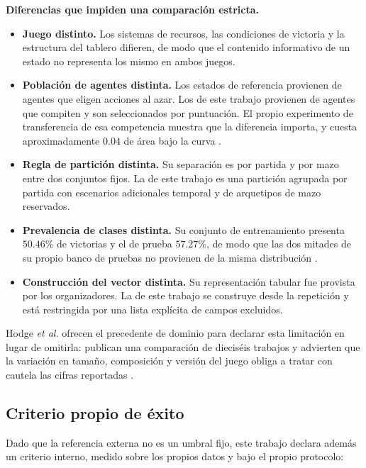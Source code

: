 \noindent\textbf{Diferencias que impiden una comparación estricta.}

\begin{itemize}
  \item \textbf{Juego distinto.} Los sistemas de recursos, las condiciones
        de victoria y la estructura del tablero difieren, de modo que el
        contenido informativo de un estado no representa los mismo en ambos
        juegos.
  \item \textbf{Población de agentes distinta.} Los estados de referencia
        provienen de agentes que eligen acciones al azar. Los de este
        trabajo provienen de agentes que compiten y son seleccionados por puntuación.
        El propio experimento de transferencia de esa competencia muestra
        que la diferencia importa, y cuesta aproximadamente $0.04$ de área
        bajo la curva \cite{janusz_hearthstone_2017}.
  \item \textbf{Regla de partición distinta.} Su separación es por partida y
        por mazo entre dos conjuntos fijos. La de este trabajo es una
        partición agrupada por partida con escenarios adicionales temporal y
        de arquetipos de mazo reservados.
  \item \textbf{Prevalencia de clases distinta.} Su conjunto de
        entrenamiento presenta $50.46\%$ de victorias y el de prueba
        $57.27\%$, de modo que las dos mitades de su propio banco de pruebas
        no provienen de la misma distribución
        \cite{janusz_hearthstone_2017}.
  \item \textbf{Construcción del vector distinta.} Su representación tabular
        fue provista por los organizadores. La de este trabajo se construye
        desde la repetición y está restringida por una lista explícita de
        campos excluidos.
\end{itemize}

Hodge \textit{et al.} ofrecen el precedente de dominio para declarar esta
limitación en lugar de omitirla: publican una comparación de dieciséis
trabajos y advierten que la variación en tamaño, composición y versión del
juego obliga a tratar con cautela las cifras reportadas
\cite{hodge_winprediction_2021}.

\subsection{Criterio propio de éxito}
\label{subsec:criteriopropio}

Dado que la referencia externa no es un umbral fijo, este trabajo
declara además un criterio interno, medido sobre los propios datos y bajo el
propio protocolo:

